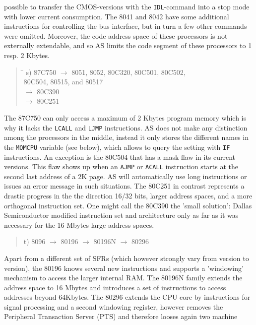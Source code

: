 \documentclass[12pt,twoside]{report}
\newcommand{\tty}[1]{{\tt #1}}
\begin{document}
possible to transfer the CMOS-versions with the \tty{IDL}-command into a
stop mode with lower current consumption.  The 8041 and 8042 have
some additional instructions for controlling the bus interface, but
in turn a few other commands were omitted.  Moreover, the code
address space of these processors is not externally extendable,
and so AS limits the code segment of these processors to 1 resp. 2
Kbytes.
\begin{quote}
\begin{tabbing}
\hspace{0.7cm} \= \kill
s) \> 87C750 $\rightarrow$ 8051, 8052, 80C320, 80C501, 80C502, \\
   \> 80C504, 80515, and 80517 \\
   \> $\rightarrow$ 80C390 \\
   \> $\rightarrow$ 80C251
\end{tabbing}
\end{quote}
The 87C750 can only access a maximum of 2 Kbytes program memory which is
why it lacks the \tty{LCALL} and \tty{LJMP} instructions.  AS does not
make any distinction among the processors in the middle, instead it only
stores the different names in the \tty{MOMCPU} variable (see below), which
allows to query the setting with \tty{IF} instructions.  An exception is
the 80C504 that has a mask flaw in its current versions.  This flaw shows
up when an \tty{AJMP} or \tty{ACALL} instruction starts at the second last
address of a 2K page.  AS will automatically use long instructions or
issues an error message in such situations.  The 80C251 in contrast
represents a drastic progress in the the direction 16/32 bits, larger
address spaces, and a more orthogonal instruction set.  One might call the
80C390 the 'small solution': Dallas Semiconductor modified instruction set
and architecture only as far as it was necessary for the 16 Mbytes large
address spaces.
\begin{quote}
t) 8096 $\rightarrow$ 80196 $\rightarrow$ 80196N $\rightarrow$ 80296
\end{quote}
Apart from a different set of SFRs (which however strongly vary from
version to version), the 80196 knows several new instructions and
supports a 'windowing' mechanism to access the larger internal RAM. 
The 80196N family extends the address space to 16 Mbytes and
introduces a set of instructions to access addresses beyond 64Kbytes. 
The 80296 extends the CPU core by instructions for signal processing
and a second windowing register, however removes the Peripheral
Transaction Server (PTS) and therefore looses again two machine
\end{document}

